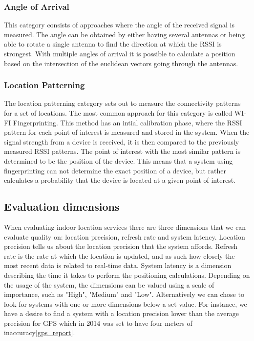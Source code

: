 \subsubsection*{Angle of Arrival}
This category consists of approaches where the angle of the received signal is measured. The angle can be obtained by either having several antennas or being able to rotate a single antenna to find the direction at which the RSSI is strongest. With multiple angles of arrival it is possible to calculate a position based on the intersection of the euclidean vectors going through the antennas.

\subsubsection*{Location Patterning}
The location patterning category sets out to measure the connectivity patterns for a set of locations. The most common approach for this category is called WI-FI Fingerprinting. This method has an intial calibration phase, where the RSSI pattern for each point of interest is measured and stored in the system. When the signal strength from a device is received, it is then compared to the previously measured RSSI patterns. The point of interest with the most similar pattern is determined to be the position of the device. This means that a system using fingerprinting can not determine the exact position of a device, but rather calculates a probability that the device is located at a given point of interest\cite{fingerprint1}.

\subsection{Evaluation dimensions}
When evaluating indoor location services there are three dimensions that we can evaluate quality on: location precision, refresh rate and system latency. Location precision tells us about the location precision that the system affords. Refresh rate is the rate at which the location is updated, and as such how closely the most recent data is related to real-time data. System latency is a dimension describing the time it takes to perform the positioning calculations\cite{dimensions}. Depending on the usage of the system, the dimensions can be valued using a scale of importance, such as "High", "Medium" and "Low". Alternatively we can chose to look for systems with one or more dimensions below a set value. For instance, we have a desire to find a system with a location precision lower than the average precision for GPS which in 2014 was set to have four meters of inaccuracy\ref{gps_report}. 

